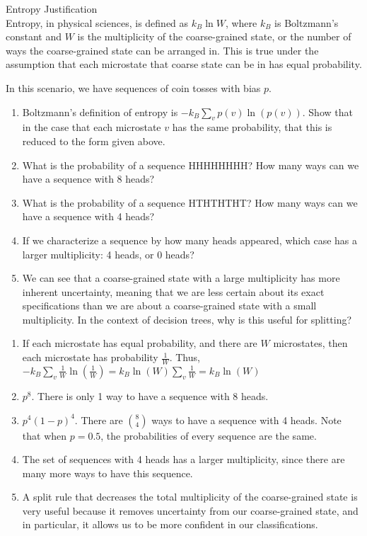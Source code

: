 
\begin{Parts}
\Part Entropy Justification \\

Entropy, in physical sciences, is defined as $k_B\ln W$, where $k_B$ is Boltzmann's constant and $W$ is the multiplicity of the coarse-grained state, or the number of ways the coarse-grained state can be arranged in. This is true under the assumption that each microstate that coarse state can be in has equal probability.

In this scenario, we have sequences of coin tosses with bias $p$.

\begin{enumerate}
  \item Boltzmann's definition of entropy is $-k_B\sum_v p(v)\ln(p(v))$. Show that in the case that each microstate $v$ has the same probability, that this is reduced to the form given above.
  \item What is the probability of a sequence HHHHHHHH? How many ways can we have a sequence with 8 heads?
  \item What is the probability of a sequence HTHTHTHT? How many ways can we have a sequence with 4 heads?
  \item If we characterize a sequence by how many heads appeared, which case has a larger multiplicity: 4 heads, or 0 heads?
  \item We can see that a coarse-grained state with a large multiplicity has more inherent uncertainty, meaning that we are less certain about its exact specifications than we are about a coarse-grained state with a small multiplicity. In the context of decision trees, why is this useful for splitting?
\end{enumerate}

\begin{solution}
  \begin{enumerate}
    \item If each microstate has equal probability, and there are $W$ microstates, then each microstate has probability $\frac{1}{W}$. Thus, $-k_B\sum_v \frac{1}{W}\ln(\frac{1}{W}) = k_B\ln(W)\sum_v\frac{1}{W} = k_B\ln(W)$
    \item $p^8$. There is only 1 way to have a sequence with 8 heads.
    \item $p^4(1-p)^4$. There are $\binom{8}{4}$ ways to have a sequence with 4 heads. Note that when $p=0.5$, the probabilities of every sequence are the same.
    \item The set of sequences with 4 heads has a larger multiplicity, since there are many more ways to have this sequence.
    \item A split rule that decreases the total multiplicity of the coarse-grained state is very useful because it removes uncertainty from our coarse-grained state, and in particular, it allows us to be more confident in our classifications.
  \end{enumerate}
\end{solution}


\end{Parts}
